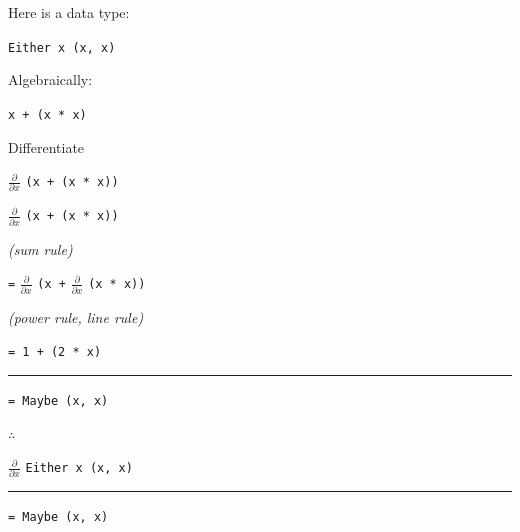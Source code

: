\begin{frame}
\begin{center}
Here is a data type:

\lstinline{Either x (x, x)}
\end{center}
\end{frame}


\begin{frame}
\begin{center}
Algebraically:

\lstinline{x + (x * x)}
\end{center}
\end{frame}


\begin{frame}
\begin{center}
Differentiate

$\frac{\partial}{\partial x}$ \lstinline{(x + (x * x))}
\end{center}
\end{frame}


\begin{frame}
\begin{center}
$\frac{\partial}{\partial x}$ \lstinline{(x + (x * x))}

\tiny{\emph{(sum rule)}}\normalsize{}

\lstinline{=} $\frac{\partial}{\partial x}$ \lstinline{(x +} $\frac{\partial}{\partial x}$ \lstinline{(x * x))}

\tiny{\emph{(power rule, line rule)}}\normalsize{}

\lstinline{= 1 + (2 * x)}

\par\noindent\rule{\textwidth}{0.4pt}

\lstinline{= Maybe (x, x)}
\end{center}
\end{frame}


\begin{frame}
\begin{block}{$\therefore$}
\begin{center}
$\frac{\partial}{\partial x}$ \lstinline{Either x (x, x)}

\par\noindent\rule{\textwidth}{0.4pt}

\lstinline{= Maybe (x, x)}
\end{center}
\end{block}
\end{frame}


